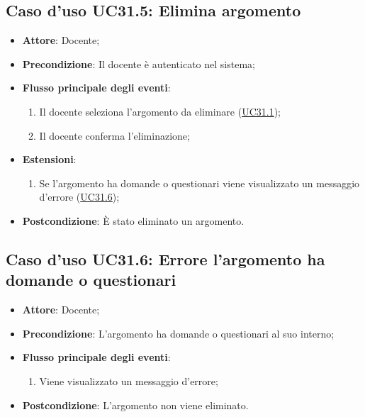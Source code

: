 \documentclass[12pt,a4paper]{article}
\begin{document}
\subsection{Caso d'uso UC31.5: Elimina argomento}

\begin{itemize}

\item \textbf{Attore}: Docente; 
\item \textbf{Precondizione}: Il docente è autenticato nel sistema;

\item \textbf{Flusso principale degli eventi}:
\begin{enumerate}
	\item Il docente seleziona l'argomento da eliminare (\hyperlink{UC31.1}{UC31.1});
	\item Il docente conferma l'eliminazione;
	
\end{enumerate}
\item \textbf{Estensioni}:
\begin{enumerate}
	\item Se l'argomento ha domande o questionari viene visualizzato un messaggio d'errore (\hyperlink{UC31.6}{UC31.6});
	
\end{enumerate}
\item \textbf{Postcondizione}: È stato eliminato un argomento.
\end{itemize}
\hypertarget{UC31.6}{}
\subsection{Caso d'uso UC31.6: Errore l'argomento ha domande o questionari}

\begin{itemize}

\item \textbf{Attore}: Docente; 
\item \textbf{Precondizione}: L'argomento ha domande o questionari al suo interno;

\item \textbf{Flusso principale degli eventi}:
\begin{enumerate}
	\item Viene visualizzato un messaggio d'errore;
	
\end{enumerate}
\item \textbf{Postcondizione}: L'argomento non viene eliminato.
\end{itemize}
\hypertarget{UC32}{}
\end{document}
